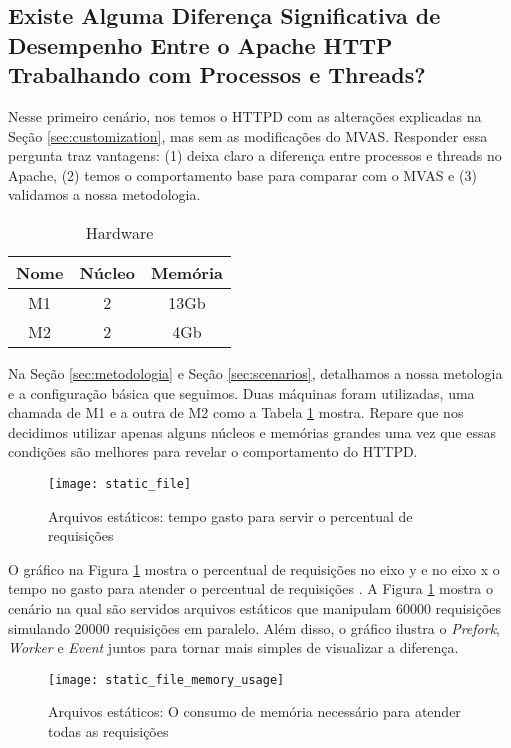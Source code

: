 \subsection{Existe Alguma Diferença Significativa de Desempenho Entre o Apache
HTTP Trabalhando com Processos e Threads?}

Nesse primeiro cenário, nos temos o HTTPD com as alterações explicadas na Seção
\ref{sec:customization}, mas sem as modificações do MVAS. Responder essa
pergunta traz vantagens: (1) deixa claro a diferença entre processos e threads
no Apache, (2) temos o comportamento base para comparar com o MVAS e (3)
validamos a nossa metodologia.

\begin{table}[h!] \centering \begin{tabular}{|c|c|c|} \hline Nome &
\textbf{Núcleo} & \textbf{Memória}\\ \hline M1 & 2 & 13Gb \\ \hline M2 & 2 &
4Gb \\ \hline \end{tabular} \caption{Hardware} \label{tab:machines} \end{table}

Na Seção \ref{sec:metodologia} e Seção \ref{sec:scenarios}, detalhamos a nossa
metologia e a configuração básica que seguimos. Duas máquinas foram utilizadas,
uma chamada de M1 e a outra de M2 como a Tabela \ref{tab:machines} mostra.
Repare que nos decidimos utilizar apenas alguns núcleos e memórias grandes uma
vez que essas condições são melhores para revelar o comportamento do HTTPD.

\begin{figure}[!h] \centering
\texttt{[image: static\_file]} \caption{Arquivos estáticos:
tempo gasto para servir o percentual de requisições} \label{fig:static_file}
\end{figure}

O gráfico na Figura \ref{fig:static_file} mostra o percentual de requisições no
eixo y e no eixo x o tempo no gasto para atender o percentual de requisições
\citep{apache_ab}. A Figura \ref{fig:static_file} mostra o cenário na qual são
servidos arquivos estáticos que manipulam 60000 requisições simulando 20000
requisições em paralelo. Além disso, o gráfico ilustra o \emph{Prefork},
\emph{Worker} e \emph{Event} juntos para tornar mais simples de visualizar a
diferença.

\begin{figure}[!h] \centering
\texttt{[image: static\_file\_memory\_usage]}
\caption{Arquivos estáticos: O consumo de memória necessário para atender todas
as requisições} \label{fig:static_file_memory} \end{figure}
 
